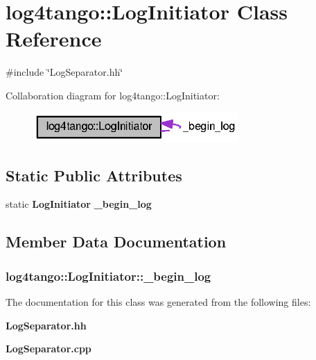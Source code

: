 \section{log4tango\-:\-:Log\-Initiator Class Reference}
\label{classlog4tango_1_1LogInitiator}


{\ttfamily \#include \char`\"{}Log\-Separator.\-hh\char`\"{}}



Collaboration diagram for log4tango\-:\-:Log\-Initiator\-:
\nopagebreak
\begin{figure}[H]
\begin{center}
\leavevmode
\includegraphics[width=221pt]{d6/d2d/classlog4tango_1_1LogInitiator__coll__graph}
\end{center}
\end{figure}
\subsection*{Static Public Attributes}
\begin{DoxyCompactItemize}
\item 
static {\bf Log\-Initiator} {\bf \-\_\-begin\-\_\-log}
\end{DoxyCompactItemize}


\subsection{Member Data Documentation}
\subsubsection[{\-\_\-begin\-\_\-log}]{ log4tango\-::\-Log\-Initiator\-::\-\_\-begin\-\_\-log\hspace{0.3cm}{\ttfamily [static]}}\label{classlog4tango_1_1LogInitiator_a662c8dd89b2ea992603dbcb852ad9ce4}


The documentation for this class was generated from the following files\-:\begin{DoxyCompactItemize}
\item 
{\bf Log\-Separator.\-hh}\item 
{\bf Log\-Separator.\-cpp}\end{DoxyCompactItemize}
